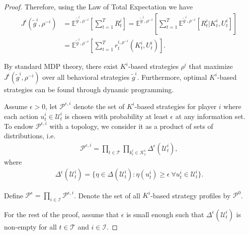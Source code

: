 \documentclass[pdflatex,sn-basic]{sn-jnl}
\newcommand{\E}{\mathbb{E}}
\newcommand{\Comp}{K}
\newcommand{\comp}{k}
\newcommand{\Compset}{\mathcal{K}}
\theoremstyle{thmstyleone}%
\theoremstyle{thmstyletwo}%
\theoremstyle{thmstylethree}%
\begin{document}
\begin{appendices}
\begin{proof}
	Therefore, using the Law of Total Expectation we have
	\begin{align}
		J^i(\tilde{g}^i, \rho^{-i}) &= \E^{\tilde{g}^i, \rho^{-i}}\left[\sum_{t=1}^T R_t^i\right] = \E^{\tilde{g}^i, \rho^{-i}}\left[\sum_{t=1}^T \E^{\tilde{g}^i, \rho^{-i}}\left[R_t^i|\Comp_t^i, U_t^i \right] \right]\\
		&=\E^{\tilde{g}^i, \rho^{-i}}\left[\sum_{t=1}^T r_t^{i, \rho^{-i}}(\Comp_t^i, U_t^i) \right].
	\end{align}
	
	By standard MDP theory, there exist $\Comp^i$-based strategies $\rho^i$ that maximize $J^i(\tilde{g}^i, \rho^{-i})$ over all behavioral strategies $\tilde{g}^i$. Furthermore, optimal $\Comp^i$-based strategies can be found through dynamic programming.
	
    Assume $\epsilon> 0$, let $\mathcal{P}^{\epsilon, i}$ denote the set of $\Comp^i$-based strategies for player $i$ where each action $u_t^i\in \mathcal{U}_t^i$ is chosen with probability at least $\epsilon$ at any information set. To endow $\mathcal{P}^{\epsilon, i}$ with a topology, we consider it as a product of sets of distributions, i.e.
	\begin{align}
		\mathcal{P}^{\epsilon, i} = \prod_{t\in\mathcal{T}}\prod_{\comp_t^i\in\Compset_t^i} \Delta^\epsilon(\mathcal{U}_t^i),
	\end{align}
	where
	\begin{align}
		\Delta^\epsilon(\mathcal{U}_t^i) = \{\eta \in\Delta(\mathcal{U}_t^i): \eta(u_t^i)\geq \epsilon~\forall u_t^i\in\mathcal{U}_t^i \}.
	\end{align}
	
	Define $\mathcal{P}^\epsilon = \prod_{i\in\mathcal{I}} \mathcal{P}^{\epsilon, i}$. Denote the set of all $\Comp^i$-based strategy profiles by $\mathcal{P}^0$.
	
	For the rest of the proof, assume that $\epsilon$ is small enough such that $\Delta^\epsilon(\mathcal{U}_t^i)$ is non-empty for all $t\in\mathcal{T}$ and $i\in\mathcal{I}$. 
	

\end{proof}
\end{appendices}
\end{document}
